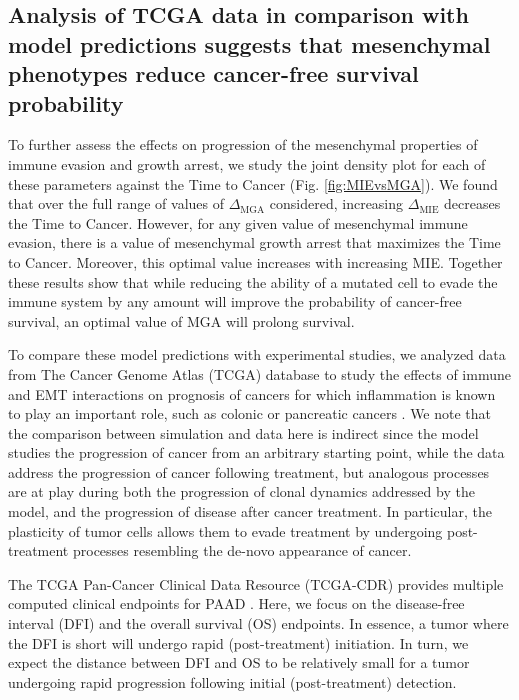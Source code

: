 \documentclass[11pt]{article}
\begin{document}
\subsection{Analysis of TCGA data in comparison with model predictions suggests that mesenchymal phenotypes reduce cancer-free survival probability}\label{tcga}


To further assess the effects on progression of the mesenchymal properties of immune evasion and growth arrest, we study the joint density plot for each of these parameters against the Time to Cancer (Fig. \ref{fig:MIEvsMGA}). We found that over the full range of values of $\Delta_\text{MGA}$ considered, increasing $\Delta_\text{MIE}$ decreases the Time to Cancer. However, for any given value of mesenchymal immune evasion, there is a value of mesenchymal growth arrest that maximizes the Time to Cancer. Moreover, this optimal value increases with increasing MIE. Together these results show that while reducing the ability of a mutated cell to evade the immune system by any amount will improve the probability of cancer-free survival, an optimal value of MGA will prolong survival. 
\par
To compare these model predictions with experimental studies, we analyzed data from The Cancer Genome Atlas (TCGA) database to study the effects of immune and EMT interactions on prognosis of cancers for which inflammation is known to play an important role, such as colonic or pancreatic cancers \cite{greten2019inflammation,hu2010inflammation}.
We note that the comparison between simulation and data here is indirect since the model studies the progression of cancer from an arbitrary starting point, while the data address the progression of cancer following treatment, but analogous processes are at play during both the progression of  clonal dynamics addressed by the model, and the progression of disease after cancer treatment.
In particular, the plasticity of tumor cells allows them to evade treatment by undergoing post-treatment processes resembling the de-novo appearance of cancer\cite{sanchez2018slow}.
\par 
The TCGA Pan-Cancer Clinical Data Resource (TCGA-CDR) provides multiple computed clinical endpoints for PAAD \cite{liu2018integrated}.
Here, we focus on the disease-free interval (DFI) and the overall survival (OS) endpoints.
In essence, a tumor where the DFI is short will undergo rapid (post-treatment) initiation.
In turn, we expect the distance between DFI and OS to be relatively small for a tumor undergoing rapid progression following initial (post-treatment) detection.
\end{document}
